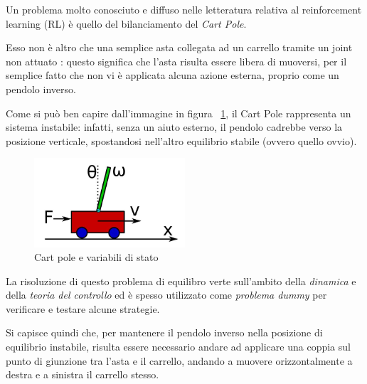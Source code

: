 Un problema molto conosciuto e diffuso nelle letteratura relativa al reinforcement learning (RL) è quello del bilanciamento del  \textit{Cart Pole}.

Esso non è altro che una semplice asta collegata ad un carrello tramite un joint non attuato : questo significa che l'asta risulta essere libera di muoversi, per il semplice fatto che non vi è applicata alcuna azione esterna, proprio come un pendolo inverso.

Come si può ben capire dall'immagine in figura ~\ref{fig:CartPole}, il Cart Pole rappresenta un sistema instabile: infatti, senza un aiuto esterno, il pendolo cadrebbe verso la posizione verticale, spostandosi nell'altro equilibrio stabile (ovvero quello ovvio).

\begin{figure}[h]
	\centering
	\includegraphics[width=0.5\textwidth]{Immagini/CartPole.JPG}
	\caption{Cart pole e variabili di stato}
	\label{fig:CartPole}
\end{figure}

La risoluzione di questo problema di equilibro verte sull'ambito della \textit{dinamica} e della \textit{teoria del controllo} ed è spesso utilizzato come \textit{problema dummy} per verificare e testare alcune strategie.

Si capisce quindi che, per mantenere il pendolo inverso nella posizione di equilibrio instabile, risulta essere necessario andare ad applicare una coppia sul punto di giunzione tra l'asta e il carrello, andando a muovere orizzontalmente a destra e a sinistra il carrello stesso.